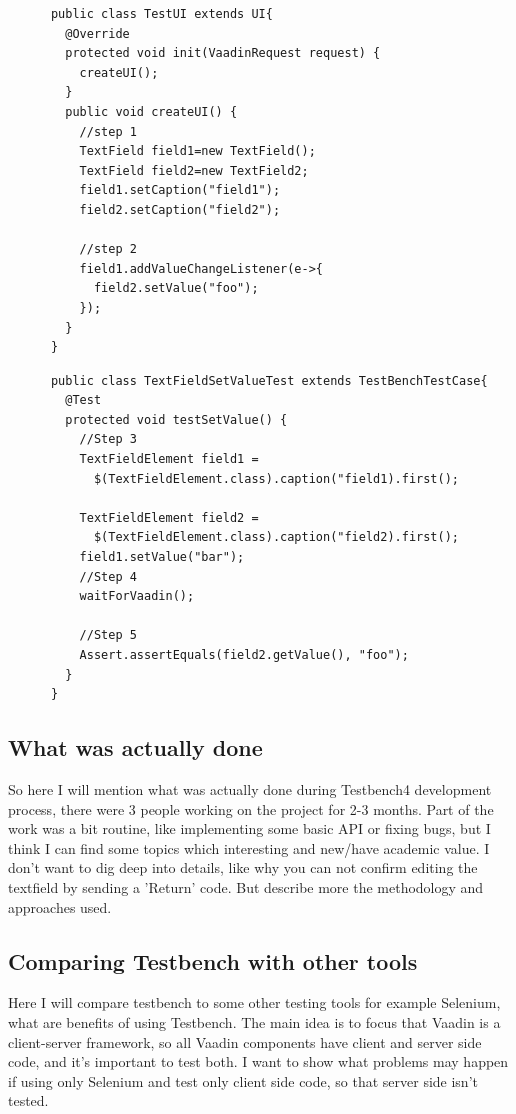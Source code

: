 \documentclass{article}
\begin{document}
  
    \lstset{language=Java}
    \begin{lstlisting}
      public class TestUI extends UI{
        @Override
        protected void init(VaadinRequest request) {
          createUI();
        }
        public void createUI() {
          //step 1 
          TextField field1=new TextField();
          TextField field2=new TextField2;
          field1.setCaption("field1");
          field2.setCaption("field2");
          
          //step 2
          field1.addValueChangeListener(e->{
            field2.setValue("foo");
          });
        }
      }
    \end{lstlisting}  
    
    \lstset{language=Java}
    \begin{lstlisting}
      public class TextFieldSetValueTest extends TestBenchTestCase{
        @Test
        protected void testSetValue() {
          //Step 3
          TextFieldElement field1 =
            $(TextFieldElement.class).caption("field1).first();
            
          TextFieldElement field2 =
            $(TextFieldElement.class).caption("field2).first();  
          field1.setValue("bar");
          //Step 4
          waitForVaadin();
          
          //Step 5
          Assert.assertEquals(field2.getValue(), "foo");           
        }
      }
    \end{lstlisting}  
     \subsection {What was actually done}
      So here I will mention what was actually done during Testbench4
      development process, there were 3 people working on the project for 2-3
      months. Part of the work was a bit routine, like implementing some basic
      API or fixing bugs, but I think I can find some topics which interesting
      and new/have academic value. I don't want to dig deep into details, like
      why you can not confirm editing the textfield by sending a 'Return' code.
      But describe more the methodology and approaches used.
      
   \subsection {Comparing Testbench with other tools}
    Here I will compare testbench to some other testing tools for example
    Selenium, what are benefits of using Testbench. The main idea is to focus
    that Vaadin is a client-server framework, so all Vaadin components have
    client and server side code, and it's important to test both. I want to show
    what problems may happen if using only Selenium and test only client side
    code, so that server side isn't tested. 
    
\end{document}
